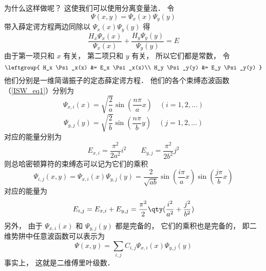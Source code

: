 为什么这样做呢？ 这使我们可以使用分离变量法． 令
\begin{equation}
\Psi(x, y) = \Psi_x(x)\Psi_y(y)
\end{equation}
带入薛定谔方程两边同除以 $\Psi_x(x)\Psi_y(y)$ 得
\begin{equation}
\frac{H_x \Psi_x(x)}{\Psi_x(x)} + \frac{H_y \Psi_y(y)}{\Psi_y(y)} = E
\end{equation}
由于第一项只和 $x$ 有关， 第二项只和 $y$ 有关， 所以它们都是常数， 令
\begin{equation}
\leftgroup{
H_x \Psi_x(x) &= E_x \Psi_x(x)\\
H_y \Psi_y(y) &= E_y \Psi_y(y)
}
\end{equation}
他们分别是一维简谐振子的定态薛定谔方程． 他们的各个束缚态波函数（\autoref{ISW_eq1}）分别为
\begin{equation}
\Psi_{x, i}(x) = \sqrt{\frac{2}{a}} \sin(\frac{n\pi}{a} x) \quad (i = 1,2,...)
\end{equation}
\begin{equation}
\Psi_{y, j}(y) = \sqrt{\frac{2}{b}} \sin(\frac{n\pi }{b} y) \quad (j = 1,2,...)
\end{equation}
对应的能量分别为
\begin{equation}
E_{x, i} = \frac{\pi^2}{2 a^2} i^2
\qquad
E_{y, j} = \frac{\pi^2}{2 b^2} j^2
\end{equation}
则总哈密顿算符的束缚态可以记为它们的乘积
\begin{equation}
\Psi_{i, j}(x, y) = \Psi_{x, i}(x) \Psi_{y, j}(y) = \frac{2}{\sqrt{ab}} \sin(\frac{i \pi}{a} x) \sin(\frac{j \pi}{b} x)
\end{equation}
对应的能量为
\begin{equation}
E_{i, j} = E_{x,i} + E_{y,j} = \frac{\pi^2}{2} \qty(\frac{i^2}{a^2} + \frac{j^2}{b^2})
\end{equation}
另外， 由于 $\Psi_{x, i}(x)$ 和 $\Psi_{y, j}(y)$ 都是完备的， 它们的乘积也是完备的， 即二维势阱中任意波函数可以表示为
\begin{equation}
\Psi(x, y) = \sum_{i,j} C_{i, j} \Psi_{x, i}(x) \Psi_{y, j}(y)
\end{equation}
事实上， 这就是二维傅里叶级数． %
